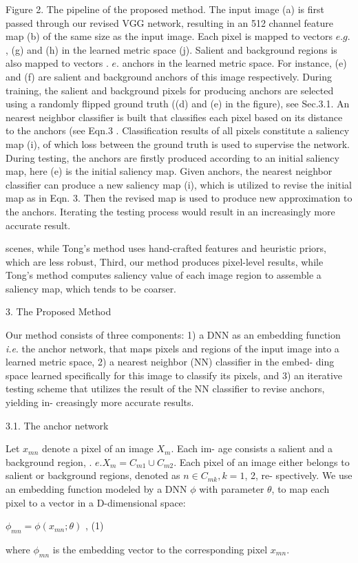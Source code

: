 \documentclass[a4paper,10pt]{article}
\begin{document}
Figure 2. The pipeline of the proposed method. The input image (a) is first passed through our revised VGG network, resulting in an 512 channel feature map (b) of the same size as the input image. Each pixel is mapped to vectors $e.g.$, (g) and (h) in the learned metric space (j). Salient and background regions is also mapped to vectors . $e$. anchors in the learned metric space. For instance, (e) and (f) are salient and background anchors of this image respectively. During training, the salient and background pixels for producing anchors are selected using a randomly flipped ground truth ((d) and (e) in the figure), see Sec.3.1. An nearest neighbor classifier is built that classifies each pixel based on its distance to the anchors (see Eqn.3 . Classification results of all pixels constitute a saliency map (i), of which loss between the ground truth is used to supervise the network. During testing, the anchors are firstly produced according to an initial saliency map, here (e) is the initial saliency map. Given anchors, the nearest neighbor classifier can produce a new saliency map (i), which is utilized to revise the initial map as in Eqn. 3. Then the revised map is used to produce new approximation to the anchors. Iterating the testing process would result in an increasingly more accurate result.

scenes, while Tong's method uses hand-crafted features and heuristic priors, which are less robust, Third, our method produces pixel-level results, while Tong's method computes saliency value of each image region to assemble a saliency map, which tends to be coarser.

3. The Proposed Method

Our method consists of three components: 1) a DNN as an embedding function {\it i.e}. the anchor network, that maps pixels and regions of the input image into a learned metric space, 2) a nearest neighbor (NN) classifier in the embed- ding space learned specifically for this image to classify its pixels, and 3) an iterative testing scheme that utilizes the result of the NN classifier to revise anchors, yielding in- creasingly more accurate results.

3.1. The anchor network

Let $x_{mn}$ denote a pixel of an image $X_{m}$. Each im- age consists a salient and a background region, . $e. X_{m}= C_{m1}\cup C_{m2}$. Each pixel of an image either belongs to salient or background regions, denoted as $n\in C_{mk}, k=1$, 2, re- spectively. We use an embedding function modeled by a DNN $\phi$ with parameter $\theta$, to map each pixel to a vector in a $\mathrm{D}$-dimensional space:
\begin{center}
$\phi_{mn}=\phi(x_{mn};\theta)$ ,   (1)
\end{center}
where $\phi_{mn}$ is the embedding vector to the corresponding pixel $x_{mn}.$
\end{document}
